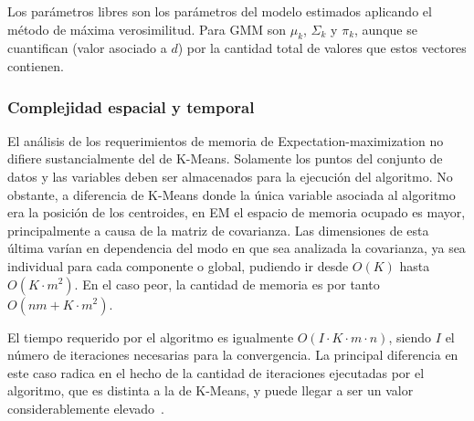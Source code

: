 Los parámetros libres son los parámetros del modelo estimados aplicando el método de máxima verosimilitud.
Para GMM son $\mu_k$, $\Sigma_k$ y $\pi_k$, aunque se cuantifican (valor asociado a $d$) por la cantidad total de valores que estos vectores contienen.

\subsubsection{Complejidad espacial y temporal}

El análisis de los requerimientos de memoria de Expectation-maximization no difiere sustancialmente del de K-Means.
Solamente los puntos del conjunto de datos y las variables deben ser almacenados para la ejecución del algoritmo.
No obstante, a diferencia de K-Means donde la única variable asociada al algoritmo era la posición de los centroides, en EM el espacio de memoria ocupado es mayor, principalmente a causa de la matriz de covarianza.
Las dimensiones de esta última varían en dependencia del modo en que sea analizada la covarianza, ya sea individual para cada componente o global, pudiendo ir desde $O(K)$ hasta $O(K \cdot m^2)$.
En el caso peor, la cantidad de memoria es por tanto $O(nm + K \cdot m^2)$.

El tiempo requerido por el algoritmo es igualmente $O(I\cdot K\cdot m\cdot n)$, siendo $I$ el número de iteraciones necesarias para la convergencia. La principal diferencia en este caso radica en el hecho de la cantidad de iteraciones ejecutadas por el algoritmo, que es distinta a la de K-Means, y puede llegar a ser un valor considerablemente elevado~\cite{Firdaus15,Park09}.
